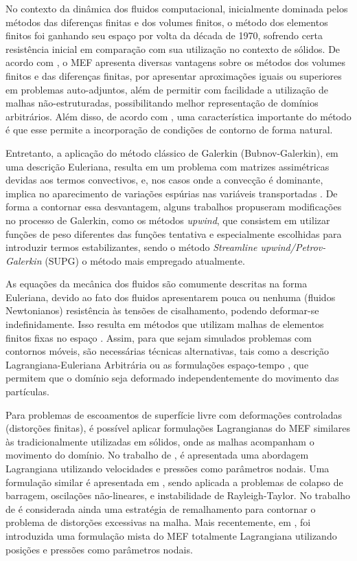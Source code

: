 \documentclass[Tese.tex]{subfiles}
\begin{document}
No contexto da dinâmica dos fluidos computacional, inicialmente dominada pelos métodos das diferenças finitas e dos volumes finitos, o método dos elementos finitos foi ganhando seu espaço por volta da década de 1970, sofrendo certa resistência inicial em comparação com sua utilização no contexto de sólidos. De acordo com , o MEF apresenta diversas vantagens sobre os métodos dos volumes finitos e das diferenças finitas, por
apresentar aproximações iguais ou superiores em problemas auto-adjuntos, além de permitir com facilidade a utilização de malhas não-estruturadas, possibilitando melhor representação de domínios
arbitrários. Além disso, de acordo com , uma
característica importante do método é que esse permite a incorporação
de condições de contorno de forma natural.

Entretanto, a aplicação do método clássico de Galerkin (Bubnov-Galerkin), em uma descrição Euleriana, resulta em um problema com matrizes assimétricas devidas aos termos convectivos, e, nos casos onde a convecção é dominante, implica no aparecimento de variações espúrias nas variáveis transportadas \cite{zienkiewicz2000finite,BROOKS1982199}. De forma a contornar essa desvantagem, alguns trabalhos propuseram modificações no processo de Galerkin, como os métodos \textit{upwind},
que consistem em utilizar funções de peso diferentes das funções tentativa e especialmente escolhidas para introduzir termos estabilizantes, sendo o método \textit{Streamline upwind/Petrov-Galerkin} (SUPG)  o método mais empregado atualmente.

As equações da mecânica dos fluidos são comumente descritas na forma Euleriana, devido ao fato dos fluidos apresentarem pouca ou nenhuma (fluidos Newtonianos) resistência às tensões de cisalhamento, podendo deformar-se indefinidamente. Isso resulta em métodos que utilizam malhas de elementos finitos fixas no espaço \cite{zienkiewicz2000finite,Dick2009,bazilevs2013computational}. Assim, para que sejam simulados problemas com contornos móveis, são necessárias técnicas alternativas, tais como a descrição Lagrangiana-Euleriana Arbitrária \cite{DONEA1982689} ou as formulações espaço-tempo \cite{bazilevs2013computational,TEZDUYAR1992339}, que permitem que o domínio seja deformado independentemente do movimento das partículas. 

Para problemas de escoamentos de superfície livre com deformações controladas (distorções finitas), é possível aplicar formulações Lagrangianas do MEF similares às tradicionalmente utilizadas em sólidos, onde as malhas acompanham o movimento do domínio. No trabalho de , é apresentada uma abordagem Lagrangiana utilizando velocidades e pressões como parâmetros nodais. Uma formulação similar é apresentada em , sendo aplicada a problemas de colapso de barragem, oscilações não-lineares, e instabilidade de Rayleigh-Taylor. No trabalho de  é considerada ainda uma estratégia de remalhamento para contornar o problema de distorções excessivas na malha. Mais recentemente, em , foi introduzida uma formulação mista do MEF totalmente Lagrangiana utilizando posições e pressões como parâmetros nodais.
\end{document}
